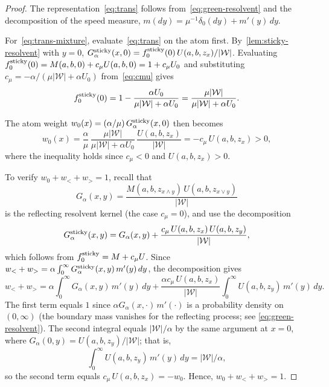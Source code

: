 \documentclass[aap,preprint]{imsart}
\numberwithin{equation}{section}
\theoremstyle{plain}
\theoremstyle{definition}
\begin{document}
\begin{proof}
  The representation~\cref{eq:trans} follows from~\cref{eq:green-resolvent}
  and the decomposition of the speed measure,
  $m(dy)=\mu^{-1}\delta_0(dy)+m'(y)\,dy$.

  For~\cref{eq:trans-mixture}, evaluate~\cref{eq:trans} on the atom first.
  By~\cref{lem:sticky-resolvent} with $y=0$,
  $G^{\rm sticky}_\alpha(x,0) = f_0^{\rm sticky}(0)\,U(a,b,z_x)/|\mathcal{W}|$.
  Evaluating $f_0^{\rm sticky}(0) = M(a,b,0)+c_\mu U(a,b,0) = 1+c_\mu U_0$
  and substituting $c_\mu=-\alpha/(\mu|\mathcal{W}|+\alpha U_0)$
  from~\cref{eq:cmu} gives
  \begin{equation}\label{eq:f0sticky-zero}   
    f_0^{\rm sticky}(0)
    = 1 - \frac{\alpha U_0}{\mu|\mathcal{W}|+\alpha U_0}
    = \frac{\mu|\mathcal{W}|}{\mu|\mathcal{W}|+\alpha U_0}.
  \end{equation}

  The atom weight $w_0(x) = (\alpha/\mu)\,G^{\rm sticky}_\alpha(x,0)$ then
  becomes
  \[
    w_0(x)
    = \frac{\alpha}{\mu}
      \,\frac{\mu|\mathcal{W}|}{\mu|\mathcal{W}|+\alpha U_0}
      \,\frac{U(a,b,z_x)}{|\mathcal{W}|}
    = -c_\mu\,U(a,b,z_x) > 0,
  \]
  where the inequality holds since $c_\mu<0$ and $U(a,b,z_x)>0$.

  To verify $w_0+w_<+w_>=1$, recall that
  \[
    G_\alpha(x,y) = \frac{M(a,b,z_{x\wedge y})\,U(a,b,z_{x\vee y})}{|\mathcal{W}|}
  \]
  is the reflecting resolvent kernel (the case $c_\mu=0$), and use the decomposition
  \[
    G^{\rm sticky}_\alpha(x,y)
    = G_\alpha(x,y)
    + \frac{c_\mu\,U(a,b,z_x)\,U(a,b,z_y)}{|\mathcal{W}|},
  \]
  which follows from $f^{\rm sticky}_0 = M + c_\mu U$. Since
  $w_<+w_> = \alpha\int_0^\infty G^{\rm sticky}_\alpha(x,y)\,m'(y)\,dy$,
  the decomposition gives
  \[
    w_<+w_>
    = \alpha\int_0^\infty G_\alpha(x,y)\,m'(y)\,dy
    + \frac{\alpha c_\mu\,U(a,b,z_x)}{|\mathcal{W}|}\int_0^\infty U(a,b,z_y)\,m'(y)\,dy.
  \]
  The first term equals $1$ since $\alpha G_\alpha(x,\cdot)\,m'(\cdot)$
  is a probability density on $(0,\infty)$ (the boundary mass vanishes for
  the reflecting process; see \cref{eq:green-resolvent}).
  The second integral equals $|\mathcal{W}|/\alpha$ by the same argument at
  $x=0$, where $G_\alpha(0,y)=U(a,b,z_y)/|\mathcal{W}|$; that is,
  \begin{equation}\label{eq:U-integral}
    \int_0^\infty U(a,b,z_y)\,m'(y)\,dy = |\mathcal{W}|/\alpha,
  \end{equation}
  so the second term equals $c_\mu\,U(a,b,z_x)=-w_0$.
  Hence, $w_0+w_<+w_>=1$.
\end{proof} 
\end{document}
